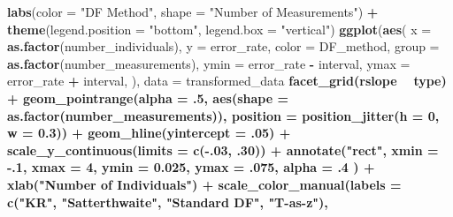 \documentclass[12pt, twoside]{amherstthesis}
\newenvironment{Shaded}{\begin{snugshade}}{\end{snugshade}}
\newcommand{\DataTypeTok}[1]{\textcolor[rgb]{0.13,0.29,0.53}{#1}}
\newcommand{\DecValTok}[1]{\textcolor[rgb]{0.00,0.00,0.81}{#1}}
\newcommand{\FloatTok}[1]{\textcolor[rgb]{0.00,0.00,0.81}{#1}}
\newcommand{\KeywordTok}[1]{\textcolor[rgb]{0.13,0.29,0.53}{\textbf{#1}}}
\newcommand{\NormalTok}[1]{#1}
\newcommand{\OperatorTok}[1]{\textcolor[rgb]{0.81,0.36,0.00}{\textbf{#1}}}
\newcommand{\StringTok}[1]{\textcolor[rgb]{0.31,0.60,0.02}{#1}}
\begin{document}
\begin{Shaded}
\begin{Highlighting}[]
{{{{{{{{{{{{\StringTok{  }\KeywordTok{labs}\NormalTok{(}\DataTypeTok{color =} \StringTok{"DF Method"}\NormalTok{, }\DataTypeTok{shape =} \StringTok{"Number of Measurements"}\NormalTok{) }\OperatorTok{+}
\StringTok{  }\KeywordTok{theme}\NormalTok{(}\DataTypeTok{legend.position =} \StringTok{"bottom"}\NormalTok{, }\DataTypeTok{legend.box =} \StringTok{"vertical"}\NormalTok{)}
\KeywordTok{ggplot}\NormalTok{(}\KeywordTok{aes}\NormalTok{(}
  \DataTypeTok{x =} \KeywordTok{as.factor}\NormalTok{(number_individuals), }\DataTypeTok{y =}\NormalTok{ error_rate, }\DataTypeTok{color =}\NormalTok{ DF_method,}
  \DataTypeTok{group =} \KeywordTok{as.factor}\NormalTok{(number_measurements), }\DataTypeTok{ymin =}\NormalTok{ error_rate }\OperatorTok{-}\StringTok{ }\NormalTok{interval, }
  \DataTypeTok{ymax =}\NormalTok{ error_rate }\OperatorTok{+}\StringTok{ }\NormalTok{interval,}
\NormalTok{), }\DataTypeTok{data =}\NormalTok{ transformed_data }\OperatorTok{%>%}\StringTok{ }\KeywordTok{filter}\NormalTok{(distribution }\OperatorTok{==}\StringTok{ "Gaussian"}\NormalTok{)) }\OperatorTok{+}
\StringTok{  }\KeywordTok{facet_grid}\NormalTok{(rslope }\OperatorTok{~}\StringTok{ }\NormalTok{type) }\OperatorTok{+}
\StringTok{  }\KeywordTok{geom_pointrange}\NormalTok{(}\DataTypeTok{alpha =} \FloatTok{.5}\NormalTok{, }\KeywordTok{aes}\NormalTok{(}\DataTypeTok{shape =} \KeywordTok{as.factor}\NormalTok{(number_measurements)), }
                  \DataTypeTok{position =} \KeywordTok{position_jitter}\NormalTok{(}\DataTypeTok{h =} \DecValTok{0}\NormalTok{, }\DataTypeTok{w =} \FloatTok{0.3}\NormalTok{)) }\OperatorTok{+}
\StringTok{  }\KeywordTok{geom_hline}\NormalTok{(}\DataTypeTok{yintercept =} \FloatTok{.05}\NormalTok{) }\OperatorTok{+}
\StringTok{  }\KeywordTok{scale_y_continuous}\NormalTok{(}\DataTypeTok{limits =} \KeywordTok{c}\NormalTok{(}\OperatorTok{-}\NormalTok{.}\DecValTok{03}\NormalTok{, }\FloatTok{.30}\NormalTok{)) }\OperatorTok{+}
\StringTok{  }\KeywordTok{annotate}\NormalTok{(}\StringTok{"rect"}\NormalTok{,}
    \DataTypeTok{xmin =} \FloatTok{-.1}\NormalTok{, }\DataTypeTok{xmax =} \DecValTok{4}\NormalTok{, }\DataTypeTok{ymin =} \FloatTok{0.025}\NormalTok{, }\DataTypeTok{ymax =} \FloatTok{.075}\NormalTok{,}
    \DataTypeTok{alpha =} \FloatTok{.4}
\NormalTok{  ) }\OperatorTok{+}
\StringTok{  }\KeywordTok{xlab}\NormalTok{(}\StringTok{"Number of Individuals"}\NormalTok{) }\OperatorTok{+}
\StringTok{  }\KeywordTok{scale_color_manual}\NormalTok{(}\DataTypeTok{labels =} \KeywordTok{c}\NormalTok{(}\StringTok{"KR"}\NormalTok{, }\StringTok{"Satterthwaite"}\NormalTok{, }
                                \StringTok{"Standard DF"}\NormalTok{, }\StringTok{"T-as-z"}\NormalTok{), }
}}}}}}}}}}}}}
\end{Highlighting}
\end{Shaded}
\end{document}
